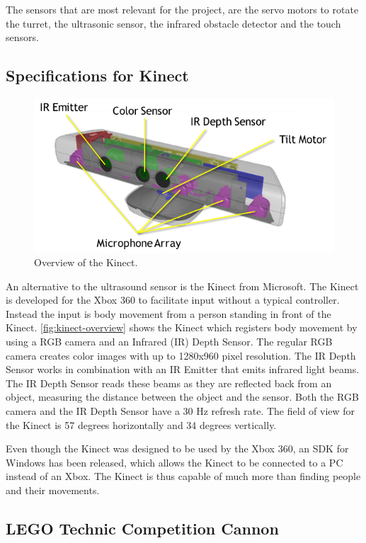The sensors that are most relevant for the project, are the servo motors to rotate the turret, the ultrasonic sensor, the infrared obstacle detector and the touch sensors.

\subsection{Specifications for Kinect}

\begin{figure}[hbtp]
\centering
\includegraphics[width=.7\textwidth]{img/kinect-overview.png}
\caption{Overview of the Kinect\cite{kinectspec}.} 
\label{fig:kinect-overview} 
\end{figure}

An alternative to the ultrasound sensor is the Kinect from Microsoft. The Kinect is developed for the Xbox 360 to facilitate input without a typical controller. Instead the input is body movement from a person standing in front of the Kinect. \autoref{fig:kinect-overview} shows the Kinect which registers body movement by using a RGB camera and an Infrared (IR) Depth Sensor\cite{kinectspec}. The regular RGB camera creates color images with up to 1280x960 pixel resolution. The IR Depth Sensor works in combination with an IR Emitter that emits infrared light beams. The IR Depth Sensor reads these beams as they are reflected back from an object, measuring the distance between the object and the sensor. Both the RGB camera and the IR Depth Sensor have a 30 Hz refresh rate. The field of view for the Kinect is 57 degrees horizontally and 34 degrees vertically.

Even though the Kinect was designed to be used by the Xbox 360, an SDK for Windows has been released, which allows the Kinect to be connected to a PC instead of an Xbox. The Kinect is thus capable of much more than finding people and their movements.

\subsection{LEGO Technic Competition Cannon}

